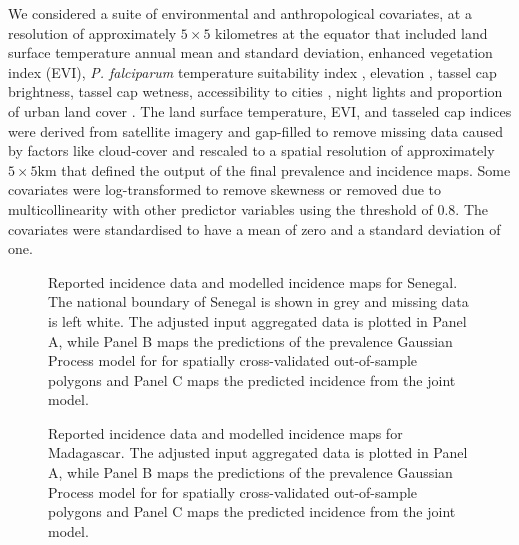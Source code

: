 \documentclass{statsoc}
\begin{document}
We considered a suite of environmental and anthropological covariates, at a resolution of approximately $5 \times 5$ kilometres at the equator that included land surface temperature annual mean and standard deviation, enhanced vegetation index (EVI), \emph{P. falciparum} temperature suitability index \citep{weiss2014air}, elevation \citep{SRTMElev}, tassel cap brightness, tassel cap wetness, accessibility to cities \citep{weiss2018global}, night lights \citep{elvidge2017viirs} and proportion of urban land cover \citep{GUF}. %
The land surface temperature, EVI, and tasseled cap indices were derived from satellite imagery and gap-filled to remove missing data caused by factors like cloud-cover \citep{weiss2014effective} and rescaled to a spatial resolution of approximately $5\times 5$km \citep{weiss2015re} that defined the output of the final prevalence and incidence maps.
Some covariates were log-transformed to remove skewness or removed due to multicollinearity with other predictor variables using the threshold of 0.8. %
The covariates were standardised to have a mean of zero and a standard deviation of one.

\begin{figure}
\caption{\label{predobsmapsen}
Reported incidence data and modelled incidence maps for Senegal. 
The national boundary of Senegal is shown in grey and missing data is left white.
The adjusted input aggregated data is plotted in Panel A, while Panel B maps the predictions of the prevalence Gaussian Process model for for spatially cross-validated out-of-sample polygons and Panel C maps the predicted incidence from the joint model.
}

\end{figure}



\begin{figure}
\caption{\label{predobsmapmdg}
Reported incidence data and modelled incidence maps for Madagascar. 
The adjusted input aggregated data is plotted in Panel A, while Panel B maps the predictions of the prevalence Gaussian Process model for for spatially cross-validated out-of-sample polygons and Panel C maps the predicted incidence from the joint model.
}

\end{figure}
\end{document}
